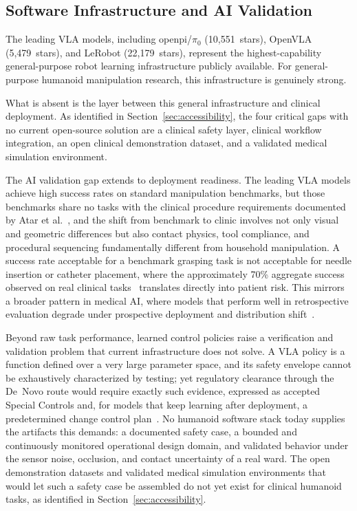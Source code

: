 \subsection{Software Infrastructure and AI Validation}
\label{sec:software}

The leading VLA models, including openpi/$\pi_0$ (10,551~stars), OpenVLA (5,479~stars),
and LeRobot (22,179~stars), represent the highest-capability general-purpose
robot learning infrastructure publicly available. For general-purpose humanoid
manipulation research, this infrastructure is genuinely strong.

What is absent is the layer between this general infrastructure and clinical
deployment. As identified in Section~\ref{sec:accessibility}, the four critical gaps
with no current open-source solution are a clinical safety layer, clinical
workflow integration, an open clinical demonstration dataset, and a validated
medical simulation environment.

The AI validation gap extends to deployment readiness. The leading VLA models
achieve high success rates on standard manipulation benchmarks, but those
benchmarks share no tasks with the clinical procedure requirements documented by
Atar et al.~\cite{atar2025humanoids}, and the shift from benchmark to clinic
involves not only visual and geometric differences but also contact physics, tool
compliance, and procedural sequencing fundamentally different from household
manipulation. A success rate acceptable for a benchmark grasping task is not
acceptable for needle insertion or catheter placement, where the approximately
70\% aggregate success observed on real clinical tasks~\cite{atar2025humanoids}
translates directly into patient risk. This mirrors a broader pattern in medical
AI, where models that perform well in retrospective evaluation degrade under
prospective deployment and distribution
shift~\cite{topol2019high,rajpurkar2022ai,coiera2019last,sendak2020real}.

Beyond raw task performance, learned control policies raise a verification and
validation problem that current infrastructure does not solve. A VLA policy is a
function defined over a very large parameter space, and its safety envelope cannot
be exhaustively characterized by testing; yet regulatory clearance through the
De~Novo route would require exactly such evidence, expressed as accepted Special
Controls and, for models that keep learning after deployment, a predetermined
change control plan~\cite{fda2021aiml,fda2024pccp}. No humanoid software stack
today supplies the artifacts this demands: a documented safety case, a bounded and
continuously monitored operational design domain, and validated behavior under the
sensor noise, occlusion, and contact uncertainty of a real ward. The open
demonstration datasets and validated medical simulation environments that would
let such a safety case be assembled do not yet exist for clinical humanoid tasks,
as identified in Section~\ref{sec:accessibility}.

